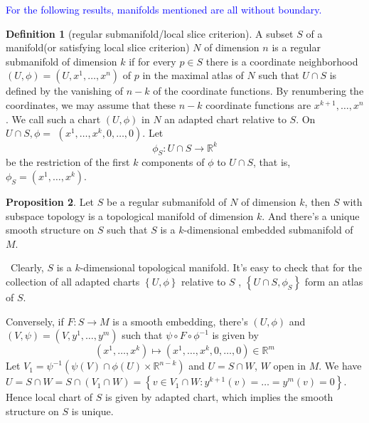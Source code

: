 \documentclass[12pt,a4paper]{book}
\newenvironment{prooff}{{\noindent\it\textcolor{cyan!40!black}{Proof}:}\,}{\par}
\newcommand{\bbrace}[1]{\left\{ #1 \right\} }
\newcommand{\bb}[1]{\mathbb{#1}}
\newcommand{\blue}[1]{\textcolor{blue}{#1}}
\theoremstyle{definition}
\newtheorem{defn}{Definition}[section]
\newtheorem{prop}[defn]{Proposition}
\begin{document}
\blue{For the following results, manifolds mentioned are all without boundary.}
\begin{defn}[regular submanifold/local slice criterion]
    A subset $S$ of a manifold(or satisfying local slice criterion) $N$ of dimension $n$ is a regular submanifold of dimension $k$ if for every $p \in S$
    there is a coordinate neighborhood $(U, \phi)=\left(U, x^1, \ldots, x^n\right)$ of $p$ in the maximal atlas of $N$ such that $U \cap S$ is defined by the vanishing of $n-k$ of the coordinate functions. By renumbering the coordinates, we may assume that these $n-k$ coordinate functions are $x^{k+1}, \ldots, x^n$.
    We call such a chart $(U, \phi)$ in $N$ an adapted chart relative to $S$. On $U \cap S, \phi=$ $\left(x^1, \ldots, x^k, 0, \ldots, 0\right)$. Let
    $$
        \phi_S: U \cap S \rightarrow \mathbb{R}^k
    $$
    be the restriction of the first $k$ components of $\phi$ to $U \cap S$, that is, $\phi_S=\left(x^1, \ldots, x^k\right)$.
\end{defn}
\begin{prop}
    Let $S$ be a regular submanifold of $N$ of dimension $k$, then $S$ with subspace topology is a topological manifold of dimension $k$.
    And there's a unique smooth structure on $S$ such that $S$ is a $k$-dimensional embedded submanifold of $M$.
    \label{proposition:smooth structure of S}
\end{prop}
\begin{prooff}
    Clearly, $S$ is a $k$-dimensional topological manifold.
    It's easy to check that for the collection of all adapted charts $\bbrace{U,\phi}$ relative to $S$ ,
    $\bbrace{U\cap S,\phi_S}$ form an atlas of $S$.

    Conversely, if $F:S\rightarrow M$ is a smooth embedding, there's $(U,\phi)$ and $(V,\psi)=(V,y^1,\dots,y^m)$ such that
    $\psi \circ F\circ \phi^{-1}$ is given by
    \begin{equation*}
        (x^1,\dots,x^k)\mapsto (x^1,\dots,x^k,0,\dots,0)\in \bb{R}^m
    \end{equation*}
    Let $V_1=\psi^{-1}(\psi(V)\cap \phi(U)\times \bb{R}^{n-k})$ and $U=S\cap W$, $W$ open in $M$.
    We have $U=S\cap W=S\cap (V_1\cap W)=\bbrace{v\in V_1\cap W: y^{k+1}(v)=\dots=y^{m}(v)=0}$.
    Hence local chart of $S$ is given by adapted chart, which implies the smooth structure on $S$
    is unique.
\end{prooff}
\end{document}
